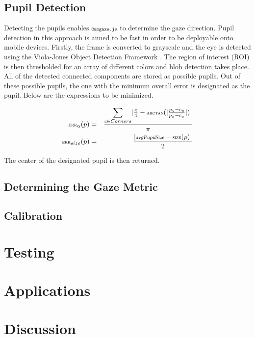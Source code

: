 \documentclass[annual]{acmsiggraph}
\newcommand{\Acronym}[1]{\ensuremath{{\small{\texttt{#1}}}}}
\newcommand{\Name}{\Acronym{Camgaze.js}}
\newcommand{\Function}[1]{\ensuremath{{\small \textsc{#1}}}}
\newcommand{\Var}[1]{\ensuremath{{\small{\textsl{#1}}}}}
\begin{document}
\subsection{Pupil Detection}

Detecting the pupils enables $\Name$ to determine the gaze direction.
Pupil detection in this approach is aimed to be fast in order to 
be deployable onto mobile devices. Firstly, the frame is converted to 
grayscale and the eye is detected using the Viola-Jones Object 
Detection Framework \cite{Viola01}. The region of interest (ROI) is
then thresholded for an array of different colors and blob detection
takes place. All of the detected connected components are stored as 
possible pupils. Out of these possible pupils, the one with the 
minimum overall error is designated as the pupil. Below are the 
expressions to be minimized.

\begin{eqnarray}
\Function{err}_{\alpha}(p) &=& \frac{
    \mathlarger{\sum}_{c \in Corners}{
        \vert 
            \frac{\pi}{4} - \Function{arctan}(
                \vert \frac{p_y - c_y}{p_x - c_x} \vert
            ) 
        \vert
    }
}{\pi} \\
\Function{err}_{size}(p) &=& \frac{
     \vert
        \Var{avgPupilSize} - \Function{size}(p)
    \vert
}{2}
\end{eqnarray}

The center of the designated pupil is then returned.

\subsection{Determining the Gaze Metric}

\subsection{Calibration}

\section{Testing}

\section{Applications}

\section{Discussion}



\end{document}
